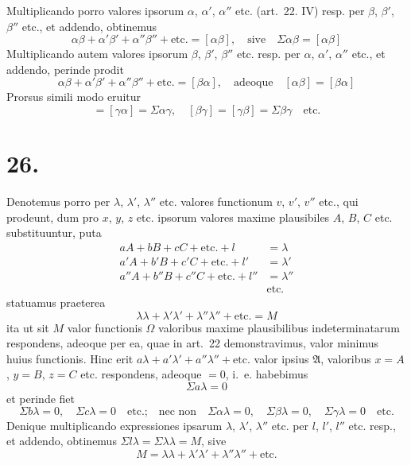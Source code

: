 \documentclass[12pt,a4paper]{book}
\begin{document}
Multiplicando porro valores ipsorum $\alpha$, $\alpha'$, $\alpha''$ etc. (art.~22. IV) resp. per $\beta$, $\beta'$, $\beta''$ etc., et addendo, obtinemus
%
\begin{equation*}
\alpha\beta+\alpha'\beta'+\alpha''\beta''+\text{etc.}=[\alpha\beta],\quad\text{sive}\quad \Sigma\alpha\beta=[\alpha\beta]
\end{equation*}
Multiplicando autem valores ipsorum $\beta$, $\beta'$, $\beta''$ etc. resp. per $\alpha$, $\alpha'$, $\alpha''$ etc., et addendo, perinde prodit
%
\begin{equation*}
\alpha\beta+\alpha'\beta'+\alpha''\beta''+\text{etc.}=[\beta\alpha],\quad\text{adeoque}\quad [\alpha\beta]=[\beta\alpha]
\end{equation*}
Prorsus simili modo eruitur
%
\begin{equation*}
[\alpha\gamma]=[\gamma\alpha]=\Sigma\alpha\gamma,\quad [\beta\gamma]=[\gamma\beta]=\Sigma\beta\gamma\quad\text{etc.}
\end{equation*}

\section*{26.}
\label{sec:art26}

Denotemus porro per $\lambda$, $\lambda'$, $\lambda''$ etc. valores functionum $v$, $v'$, $v''$ etc., qui prodeunt, dum pro $x$, $y$, $z$ etc. ipsorum valores maxime plausibiles $A$, $B$, $C$ etc. substituuntur, puta
%
\begin{align*}
aA+bB+cC+\text{etc.}+l&=\lambda\\
a'A+b'B+c'C+\text{etc.}+l'&=\lambda'\\
a''A+b''B+c''C+\text{etc.}+l''&=\lambda''\\
&\text{etc.}
\end{align*}
statuamus praeterea
%
\begin{equation*}
\lambda\lambda+\lambda'\lambda'+\lambda''\lambda''+\text{etc.}=M
\end{equation*}
ita ut sit $M$ valor functionis $\Omega$ valoribus maxime plausibilibus indeterminatarum respondens, adeoque per ea, quae in art.~22 demonstravimus, valor minimus huius functionis. Hinc erit $a\lambda+a'\lambda'+a''\lambda''+\text{etc.}$ valor ipsius $\mathfrak{A}$, valoribus $x=A$, $y=B$, $z=C$ etc. respondens, adeoque $=0$, i.~e. habebimus
%
\begin{equation*}
\Sigma a\lambda=0
\end{equation*}
et perinde fiet
%
\begin{equation*}
\Sigma b\lambda=0,\quad \Sigma c\lambda=0\quad\text{etc.;}\quad\text{nec non}\quad \Sigma\alpha\lambda=0,\quad \Sigma\beta\lambda=0,\quad \Sigma\gamma\lambda=0\quad\text{etc.}
\end{equation*}
Denique multiplicando expressiones ipsarum $\lambda$, $\lambda'$, $\lambda''$ etc. per $l$, $l'$, $l''$ etc. resp., et addendo, obtinemus $\Sigma l\lambda=\Sigma\lambda\lambda=M$, sive
%
\begin{equation*}
M=\lambda\lambda+\lambda'\lambda'+\lambda''\lambda''+\text{etc.}
\end{equation*}
\end{document}
